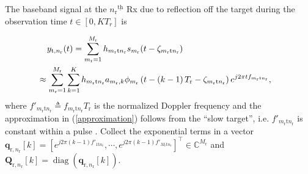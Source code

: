 \documentclass[9pt,journal]{IEEEtran}
\DeclareMathOperator{\diag}{\mathrm{diag}}
\newcommand{\paren}[1]{\left({#1}\right)}
\newcommand{\bracket}[1]{{\left [{#1}\right ]}}
\newcommand{\ith}[1]    {{#1}^{\underline{\text{th}}}}
\newcommand{\rr}{_\mathrm{r}}
\newcommand{\rnr}{_{\mathrm{r},n_\mathrm{r}}}
\newcommand{\target}{\mathrm{t}}
\theoremstyle{definition}
\begin{document}
The baseband signal at the $\ith{n\rr}$ Rx due to reflection off the target during the observation time $t\in[0,KT_r]$ is\par\noindent\small
\begin{align}
\label{target return_CT}
&y_{\mathrm{t},n\rr} (t)=\sum_{m_\mathrm{r}=1}^{M_\mathrm{r}}h_{m_\mathrm{r}\target n_\mathrm{r}}s_{m_\mathrm{r}}(t-\zeta_{m\rr \target n\rr }) \\
&\hspace{-4mm}\approx \sum_{m_\mathrm{r}=1}^{M_\mathrm{r}}\sum_{k=1}^{K} h_{m_\mathrm{r}\target n_\mathrm{r}}a_{m_\mathrm{r},k}\phi_{m_\mathrm{r}}\paren{t-\paren{k-1}T\rr-\zeta_{m\rr \target n\rr}}e^{j2\pi t
f_{m_\mathrm{r}\target n_\mathrm{r}}}, \label{approximation} 
\end{align}\normalsize
where $f'_{m_\mathrm{r}\target n_\mathrm{r}}\triangleq f_{m_\mathrm{r}\target n_\mathrm{r}}T\rr$ is the normalized Doppler frequency and the approximation in (\ref{approximation}) follows from the ``slow target'', i.e. $f'_{m_\mathrm{r}\target n_\mathrm{r}}$ %
is constant within a pulse \cite{hongbin_movingtarget,MCMIMO_Rad}.
Collect the exponential terms in a vector $\mathbf{q}_{\mathrm{r},n\rr}\bracket{k}=\bracket{e^{j2\pi\paren{k-1}f'_{1 \target n\rr}},\cdots,e^{j2\pi\paren{k-1}f'_{M\rr \target n\rr}}}^\top\in\mathbb{C}^{M\rr}$ and $\mathbf{Q}\rnr\bracket{k}=\diag\paren{\mathbf{q}_{\mathrm{r},n\rr}\bracket{k}}$.
\end{document}
